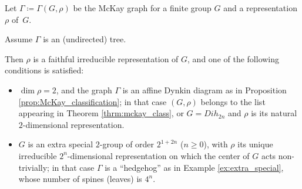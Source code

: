\begin{theorem}\label{thrm:main}
 Let $\Gamma \coloneqq  \Gamma(G, \rho)$ be the McKay graph for a finite group $G$ and a representation $\rho$ of~$G$. 
 
 Assume $\Gamma$ is an (undirected) tree. 
 
 Then $\rho$ is a faithful irreducible representation of $G$, and one of the following conditions is satisfied:
 \begin{itemize}
 \item $\dim \rho =2$, and the graph $\Gamma$ is an affine Dynkin diagram as in Proposition \ref{prop:McKay_classification}; in that case $(G, \rho)$ belongs to the list appearing in Theorem \ref{thrm:mckay_class}, or $G=Dih_{2n}$ and $\rho$ is its natural $2$-dimensional representation.
  \item $G$ is an extra special $2$-group of order  $2^{1+2n}$ ($n\geq 0$), with $\rho$ its unique irreducible $2^n$-dimensional representation on which the center of $G$ acts non-trivially; in that case $\Gamma$ is a ``hedgehog'' as in Example \ref{ex:extra_special}, whose number of spines (leaves) is $4^n$. 
 \end{itemize}

\end{theorem}
